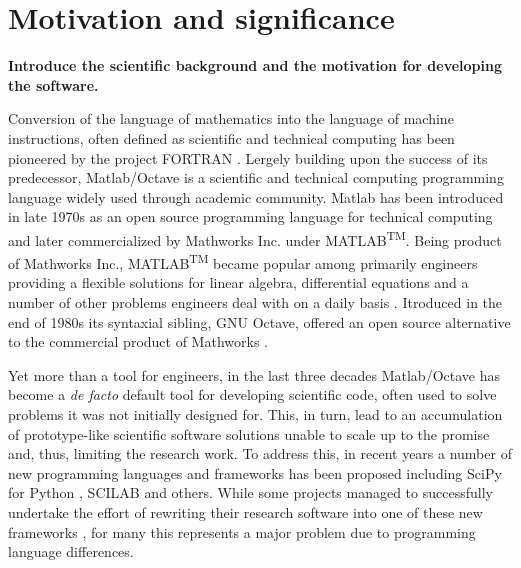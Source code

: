 \section{Motivation and significance}
\label{} 

\textbf{Introduce the scientific background and the motivation for developing the software.}

Conversion of the language of mathematics into the language of machine instructions, often defined as scientific and technical computing has been pioneered by the project FORTRAN \cite{Backus:1957:FAC}. Lergely building upon the success of its predecessor, Matlab/Octave is a scientific and technical computing programming language widely used through academic community. Matlab has been introduced in late 1970s as an open source programming language for technical computing and later commercialized by Mathworks Inc. under MATLAB\textsuperscript{TM}. Being product of Mathworks Inc., MATLAB\textsuperscript{TM} became popular among primarily engineers providing a flexible solutions for linear algebra, differential equations and a number of other problems engineers deal with on a daily basis \cite{moore2014matlab}. Itroduced in the end of 1980s its syntaxial sibling, GNU Octave, offered an open source alternative to the commercial product of Mathworks \cite{eaton1997gnu}.

Yet more than a tool for engineers, in the last three decades Matlab/Octave has become a \textit{de facto} default tool for developing scientific code, often used to solve problems it was not initially designed for. This, in turn, lead to an accumulation of prototype-like scientific software solutions unable to scale up to the promise and, thus, limiting the research work. To address this, in recent years a number of new programming languages and frameworks has been proposed including SciPy for Python \cite{jones2001open, Olivier_2002}, SCILAB \cite{Campbell_2009} and others. While some projects managed to successfully undertake the effort of rewriting their research software into one of these new frameworks \cite{17076895, 21349861}, for many this represents a major problem due to programming language differences.

